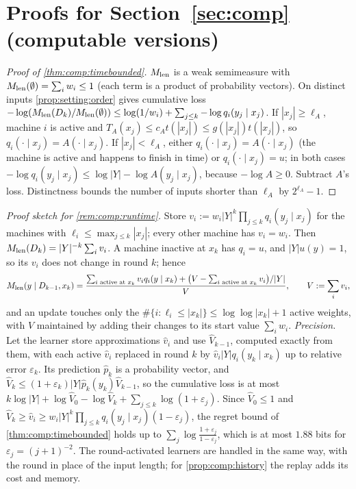 \section{Proofs for Section~\ref{sec:comp} (computable versions)}\label{app:comp}

\begin{proof}[Proof of \cref{thm:comp:timebounded}]
$M_{\mathrm{len}}$ is a weak semimeasure with $M_{\mathrm{len}}(\emptyset)=\sum_iw_i\le1$ (each term is a product of probability vectors). On distinct inputs \cref{prop:setting:order} gives cumulative loss $-\log(M_{\mathrm{len}}(D_k)/M_{\mathrm{len}}(\emptyset))\le\log(1/w_i)+\sum_{j\le k}-\log q_i(y_j\mid x_j)$. If $|x_j|\ge\ell_A$, machine $i$ is active and $T_A(x_j)\le c_At(|x_j|)\le g(|x_j|)t(|x_j|)$, so $q_i(\cdot\mid x_j)=A(\cdot\mid x_j)$. If $|x_j|<\ell_A$, either $q_i(\cdot\mid x_j)=A(\cdot\mid x_j)$ (the machine is active and happens to finish in time) or $q_i(\cdot\mid x_j)=u$; in both cases $-\log q_i(y_j\mid x_j)\le\log|Y|-\log A(y_j\mid x_j)$, because $-\log A\ge0$. Subtract $A$'s loss. Distinctness bounds the number of inputs shorter than $\ell_A$ by $2^{\ell_A}-1$.
\end{proof}

\emph{Proof sketch for \cref{rem:comp:runtime}.} Store $v_i:=w_i|Y|^k\prod_{j\le k}q_i(y_j\mid x_j)$ for the machines with $\ell_i\le\max_{j\le k}|x_j|$; every other machine has $v_i=w_i$. Then $M_{\mathrm{len}}(D_k)=|Y|^{-k}\sum_iv_i$. A machine inactive at $x_k$ has $q_i=u$, and $|Y|u(y)=1$, so its $v_i$ does not change in round $k$; hence
\[ M_{\mathrm{len}}(y\mid D_{k-1},x_k)=\frac{\sum_{i\text{ active at }x_k}v_iq_i(y\mid x_k)+\big(V-\sum_{i\text{ active at }x_k}v_i\big)/|Y|}{V},\qquad V:=\sum_iv_i, \]
and an update touches only the $\#\{i:\ell_i\le|x_k|\}\le\log\log|x_k|+1$ active weights, with $V$ maintained by adding their changes to its start value $\sum_iw_i$. \emph{Precision.} Let the learner store approximations $\hat v_i$ and use $\hat V_{k-1}$, computed exactly from them, with each active $\hat v_i$ replaced in round $k$ by $\hat v_i|Y|q_i(y_k\mid x_k)$ up to relative error $\varepsilon_k$. Its prediction $\hat p_k$ is a probability vector, and $\hat V_k\le(1+\varepsilon_k)|Y|\hat p_k(y_k)\hat V_{k-1}$, so the cumulative loss is at most $k\log|Y|+\log\hat V_0-\log\hat V_k+\sum_{j\le k}\log(1+\varepsilon_j)$. Since $\hat V_0\le1$ and $\hat V_k\ge\hat v_i\ge w_i|Y|^k\prod_{j\le k}q_i(y_j\mid x_j)(1-\varepsilon_j)$, the regret bound of \cref{thm:comp:timebounded} holds up to $\sum_j\log\frac{1+\varepsilon_j}{1-\varepsilon_j}$, which is at most $1.88$ bits for $\varepsilon_j=(j+1)^{-2}$. The round-activated learners are handled in the same way, with the round in place of the input length; for \cref{prop:comp:history} the replay adds its cost and memory.

